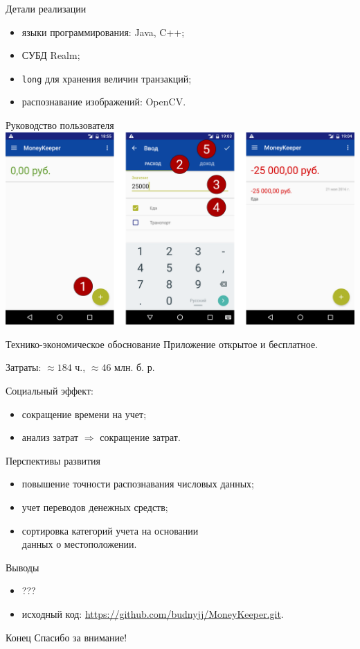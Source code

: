 \documentclass[hyperref={pdftex,unicode}]{beamer}
\begin{document}
\begin{frame}{Детали реализации}
  \begin{itemize}
    \item языки программирования: Java, C++;
    \item СУБД Realm;
    \item \texttt{long} для хранения величин транзакций;
    \item распознавание изображений: OpenCV.
  \end{itemize}
\end{frame}

\begin{frame}{Руководство пользователя}
  \centering
  \includegraphics[width=\textwidth]{fig/implementation_manual_balance_change.eps}
\end{frame}

\begin{frame}{Технико-экономическое обоснование}
  Приложение открытое и бесплатное.

  Затраты: \( \approx 184 \) ч., \( \approx 46 \) млн. б. р.

  \smallskip
  Социальный эффект:
  \begin{itemize}
  \item сокращение времени на учет;
  \item анализ затрат \( \Rightarrow \) сокращение затрат.
  \end{itemize}
\end{frame}

\begin{frame}{Перспективы развития}
  \begin{itemize}
  \item повышение точности распознавания числовых данных;
  \item учет переводов денежных средств;
  \item сортировка категорий учета на основании \\
    данных о местоположении.
  \end{itemize}
\end{frame}

\begin{frame}{Выводы}
  \begin{itemize}
  \item ???
  \item исходный код: \url{https://github.com/budnyjj/MoneyKeeper.git}.
  \end{itemize}
\end{frame}

\begin{frame}{Конец}
  \centering
  Спасибо за внимание!
\end{frame}
\end{document}

